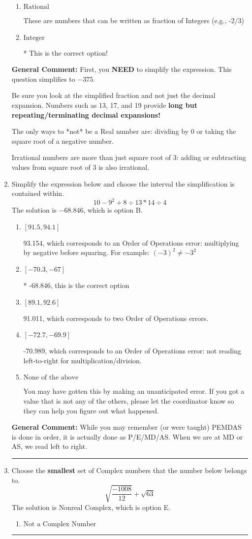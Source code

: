 \documentclass{extbook}[14pt]
\newcommand{\litem}[1]{\item #1

\rule{\textwidth}{0.4pt}}
\begin{document}
\begin{enumerate}
{\begin{enumerate}[label=\Alph*.]
These cannot be written as a fraction of Integers.
\item \( \text{Rational} \)

These are numbers that can be written as fraction of Integers (e.g., -2/3)
\item \( \text{Integer} \)

* This is the correct option!
\end{enumerate}

\textbf{General Comment:} First, you \textbf{NEED} to simplify the expression. This question simplifies to $-375$. 
 
 Be sure you look at the simplified fraction and not just the decimal expansion. Numbers such as 13, 17, and 19 provide \textbf{long but repeating/terminating decimal expansions!} 
 
 The only ways to *not* be a Real number are: dividing by 0 or taking the square root of a negative number. 
 
 Irrational numbers are more than just square root of 3: adding or subtracting values from square root of 3 is also irrational.
}
\litem{
Simplify the expression below and choose the interval the simplification is contained within.
\[ 10 - 9^2 + 8 \div 13 * 14 \div 4 \]The solution is \( -68.846 \), which is option B.\begin{enumerate}[label=\Alph*.]
\item \( [91.5, 94.1] \)

 93.154, which corresponds to an Order of Operations error: multiplying by negative before squaring. For example: $(-3)^2 \neq -3^2$
\item \( [-70.3, -67] \)

* -68.846, this is the correct option
\item \( [89.1, 92.6] \)

 91.011, which corresponds to two Order of Operations errors.
\item \( [-72.7, -69.9] \)

 -70.989, which corresponds to an Order of Operations error: not reading left-to-right for multiplication/division.
\item \( \text{None of the above} \)

 You may have gotten this by making an unanticipated error. If you got a value that is not any of the others, please let the coordinator know so they can help you figure out what happened.
\end{enumerate}

\textbf{General Comment:} While you may remember (or were taught) PEMDAS is done in order, it is actually done as P/E/MD/AS. When we are at MD or AS, we read left to right.
}
\litem{
Choose the \textbf{smallest} set of Complex numbers that the number below belongs to.
\[ \sqrt{\frac{-1008}{12}}+\sqrt{63} \]The solution is \( \text{Nonreal Complex} \), which is option E.\begin{enumerate}[label=\Alph*.]
\item \( \text{Not a Complex Number} \)


\end{enumerate}}
\end{enumerate}
\end{document}

